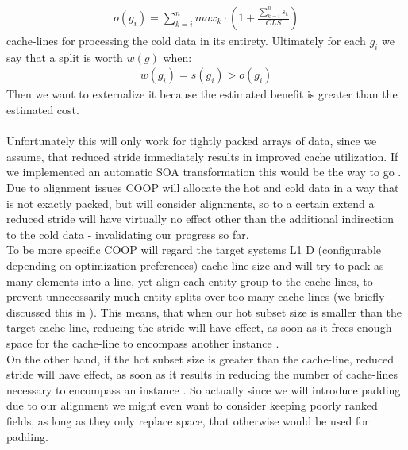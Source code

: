 \begin{align}
	o(g_i) = \sum_{k=i}^{n}max_k\cdot(1+\frac{\sum_{k=i}^{n}s_k}{CLS})
\end{align}
cache-lines for processing the cold data in its entirety. Ultimately for each $g_i$ we say that a split is worth $w(g)$ when:
\begin{align}
	w(g_i) = s(g_i) > o(g_i)
\end{align}
Then we want to externalize it because the estimated benefit is greater than the estimated cost.\\\\
Unfortunately this will only work for tightly packed arrays of data, since we assume, that reduced stride immediately results in improved cache utilization. If we implemented an automatic SOA transformation this would be the way to go . Due to alignment issues  COOP will allocate the hot and cold data in a way that is not exactly packed, but will consider alignments, so to a certain extend a reduced stride will have virtually no effect other than the additional indirection to the cold data - invalidating our progress so far.\\
To be more specific COOP will regard the target systems L1 D (configurable depending on optimization preferences) cache-line size and will try to pack as many elements into a line, yet align each entity group to the cache-lines, to prevent unnecessarily much entity splits over too many cache-lines  (we briefly discussed this in ). This means, that when our hot subset size is smaller than the target cache-line, reducing the stride will have effect, as soon as it frees enough space for the cache-line to encompass another instance .\\
On the other hand, if the hot subset size is greater than the cache-line, reduced stride will have effect, as soon as it results in reducing the number of cache-lines necessary to encompass an instance . So actually since we will introduce padding due to our alignment we might even want to consider keeping poorly ranked fields, as long as they only replace space, that otherwise would be used for padding.
